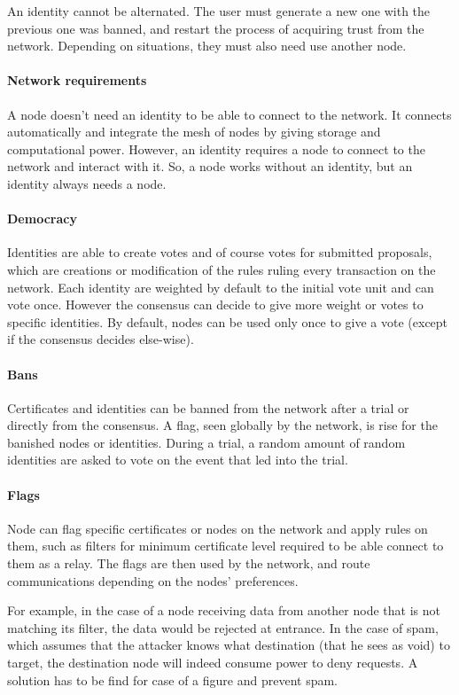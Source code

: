 An identity cannot be alternated. The user must generate a new one with the previous one was banned, and restart the process of acquiring trust from the network. Depending on situations, they must also need use another node.

\paragraph{Network requirements} A node doesn't need an identity to be able to connect to the network. It connects automatically and integrate the mesh of nodes by giving storage and computational power. However, an identity requires a node to connect to the network and interact with it. So, a node works without an identity, but an identity always needs a node.

\paragraph{Democracy} Identities are able to create votes and of course votes for submitted proposals, which are creations or modification of the rules ruling every transaction on the network. Each identity are weighted by default to the initial vote unit and can vote once. However the consensus can decide to give more weight or votes to specific identities. By default, nodes can be used only once to give a vote (except if the consensus decides else-wise).

\paragraph{Bans} Certificates and identities can be banned from the network after a trial or directly from the consensus. A flag, seen globally by the network, is rise for the banished nodes or identities. During a trial, a random amount of random identities are asked to vote on the event that led into the trial.

\paragraph{Flags} Node can flag specific certificates or nodes on the network and apply rules on them, such as filters for minimum certificate level required to be able connect to them as a relay. The flags are then used by the network, and route communications depending on the nodes' preferences.

For example, in the case of a node receiving data from another node that is not matching its filter, the data would be rejected at entrance. In the case of spam, which assumes that the attacker knows what destination (that he sees as void) to target, the destination node will indeed consume power to deny requests. A solution has to be find for case of a figure and prevent spam.

